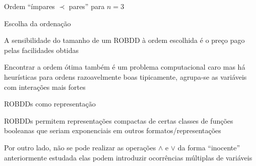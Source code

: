 \expandafter\documentclass\expandafter[table, usenames, svgnames, dvipsnames,14pt, \classopts]{beamer}
\begin{document}
\begin{frame}{Ordem ``ímpares $\prec$ pares'' para $n=3$}
\begin{figure}

    \end{figure}

\end{frame}

\begin{frame}{Escolha da ordenação}

    \begin{outline}
        \1 A sensibilidade do tamanho de um ROBDD à ordem escolhida é o preço pago pelas facilidades obtidas
        
        \vspace{1em}
        
        \1 Encontrar a ordem ótima também é um problema computacional caro
            \2[-] mas há heurísticas para ordens razoavelmente boas
            \2[-] tipicamente, agrupa-se as variáveis com interações mais fortes
            
    \end{outline}

\end{frame}

\begin{frame}{ROBDDs como representação}

    \begin{outline}
        \1 ROBDDs permitem representações compactas de certas classes de funções booleanas
            \2[-] que seriam exponenciais em outros formatos/representações
            
        \vspace{1em}
        
        \1 Por outro lado, não se pode realizar as operações $\land$ e $\lor$ da forma ``inocente'' anteriormente estudada
            \2[-] elas podem introduzir ocorrências múltiplas de variáveis
    \end{outline}

\end{frame}
\end{document}
